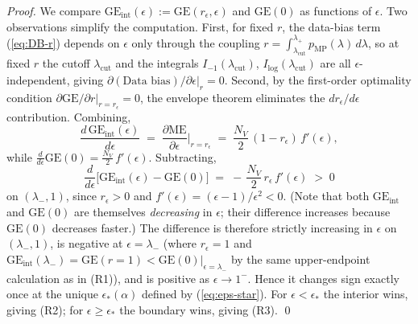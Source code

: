 \documentclass[11pt,a4paper]{article}
\theoremstyle{definition}
\theoremstyle{remark}
\newcommand{\NV}{N_V}
\begin{document}
\begin{proof}
We compare $\mathrm{GE}_{\mathrm{int}}(\epsilon) :=
\mathrm{GE}(r_{\epsilon},\epsilon)$ and $\mathrm{GE}(0)$ as
functions of $\epsilon$. Two observations simplify the
computation. First, for fixed $r$, the data-bias term
(\ref{eq:DB-r}) depends on $\epsilon$ only through the
coupling $r = \int_{\lambda_{\mathrm{cut}}}^{\lambda_{+}}
p_{\mathrm{MP}}(\lambda)\,d\lambda$, so at fixed $r$ the cutoff
$\lambda_{\mathrm{cut}}$ and the integrals
$I_{-1}(\lambda_{\mathrm{cut}})$,
$I_{\log}(\lambda_{\mathrm{cut}})$ are all
$\epsilon$-independent, giving
$\partial(\text{Data bias})/\partial\epsilon\big|_{r} = 0$.
Second, by the first-order optimality condition
$\partial\mathrm{GE}/\partial r\big|_{r=r_{\epsilon}} = 0$, the
envelope theorem eliminates the $dr_{\epsilon}/d\epsilon$
contribution. Combining,
\begin{equation*}
  \frac{d\,\mathrm{GE}_{\mathrm{int}}(\epsilon)}{d\epsilon}
  \;=\;
  \frac{\partial \mathrm{ME}}{\partial \epsilon}\bigg|_{r = r_{\epsilon}}
  \;=\;
  \frac{\NV}{2}\,(1 - r_{\epsilon})\,f'(\epsilon),
\end{equation*}
while $\frac{d}{d\epsilon}\mathrm{GE}(0) = \frac{\NV}{2}\,f'(\epsilon)$.
Subtracting,
\begin{equation*}
  \frac{d}{d\epsilon}\big[\mathrm{GE}_{\mathrm{int}}(\epsilon) - \mathrm{GE}(0)\big]
  \;=\;
  -\,\frac{\NV}{2}\,r_{\epsilon}\,f'(\epsilon)
  \;>\; 0
\end{equation*}
on $(\lambda_{-}, 1)$, since $r_{\epsilon} > 0$ and
$f'(\epsilon) = (\epsilon - 1)/\epsilon^{2} < 0$. (Note that
both $\mathrm{GE}_{\mathrm{int}}$ and $\mathrm{GE}(0)$ are
themselves \emph{decreasing} in $\epsilon$; their difference
increases because $\mathrm{GE}(0)$ decreases faster.)
The difference is therefore strictly increasing in $\epsilon$
on $(\lambda_{-}, 1)$, is negative at $\epsilon = \lambda_{-}$
(where $r_{\epsilon} = 1$ and $\mathrm{GE}_{\mathrm{int}}(\lambda_{-}) =
\mathrm{GE}(r{=}1) < \mathrm{GE}(0)|_{\epsilon = \lambda_{-}}$
by the same upper-endpoint calculation as in (R1)), and is
positive as $\epsilon \to 1^{-}$. Hence it changes sign
exactly once at the unique $\epsilon_{*}(\alpha)$ defined by
(\ref{eq:eps-star}). For $\epsilon < \epsilon_{*}$ the interior
wins, giving (R2); for $\epsilon \geq \epsilon_{*}$ the
boundary wins, giving (R3).
\qed
\end{proof}
\end{document}
